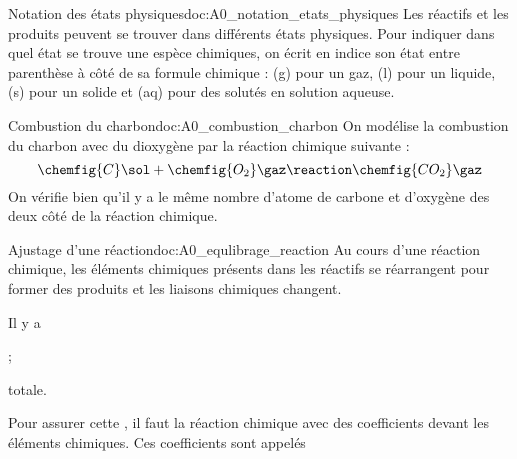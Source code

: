 \begin{doc}{Notation des états physiques}{doc:A0_notation_etats_physiques}
  Les réactifs et les produits peuvent se trouver dans différents états physiques.
  Pour indiquer dans quel état se trouve une espèce chimiques, on écrit en indice son état entre parenthèse à côté de sa formule chimique : (g) pour un gaz, (l) pour un liquide, (s) pour un solide et (aq) pour des solutés en solution aqueuse.
\end{doc}


\begin{doc}{Combustion du charbon}{doc:A0_combustion_charbon}
  On modélise la combustion du charbon avec du dioxygène par la réaction chimique suivante :
  \begin{equation*}
    \chemfig{C}\sol + \chemfig{O_2}\gaz \reaction \chemfig{CO_2}\gaz
  \end{equation*}
  On vérifie bien qu'il y a le même nombre d'atome de carbone et d'oxygène des deux côté de la réaction chimique.
\end{doc}




\begin{doc}{Ajustage d'une réaction}{doc:A0_equlibrage_reaction}
  Au cours d'une réaction chimique, les éléments chimiques présents dans les réactifs se réarrangent pour former des produits et les liaisons chimiques changent.
  \begin{importants}
    Il y a  
    \begin{listePoints}
      \item {} ;
      \item {} totale.
    \end{listePoints}
  \end{importants}
  \begin{importants}
    Pour assurer cette , il faut  la réaction chimique avec des coefficients devant les éléments chimiques.
    Ces coefficients sont appelés 
  \end{importants}
\end{doc}

